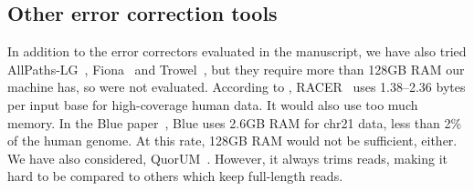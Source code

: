 \documentclass{bioinfo2}
\begin{document}
\subsection{Other error correction tools}

In addition to the error correctors evaluated in the manuscript, we have also
tried AllPaths-LG~\citep{Gnerre:2011ys}, Fiona~\citep{Schulz:2014aa} and
Trowel~\citep{Lim:2014aa}, but they require more than 128GB RAM our machine
has, so were not evaluated. According to \citet{Molnar:2014aa},
RACER~\citep{Ilie:2013aa} uses 1.38--2.36 bytes per input base for
high-coverage human data. It would also use too much memory.  In the Blue
paper~\citep{Greenfield:2014aa}, Blue uses 2.6GB RAM for chr21 data, less than
2\% of the human genome. At this rate, 128GB RAM would not be sufficient,
either. We have also considered, QuorUM~\citep{Zimin:2013aa}.  However,
it always trims reads, making it hard to be compared to others which keep
full-length reads.

%
%


\end{document}
